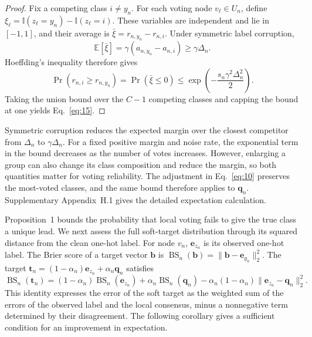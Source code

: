 \documentclass[times,review,10pt]{elsarticle}
\theoremstyle{definition}
\theoremstyle{plain}
\begin{document}
\begin{proof}
\renewcommand{\qedsymbol}{}
Fix a competing class \(i\ne y_n\). For each voting node \(v_\ell\in U_n\), define \(\xi_\ell=\mathbb I(z_\ell=y_n)-\mathbb I(z_\ell=i)\). These variables are independent and lie in \([-1,1]\), and their average is \(\bar\xi=r_{n,y_n}-r_{n,i}\). Under symmetric label corruption,
\[
\mathbb E[\bar\xi]=\gamma(a_{n,y_n}-a_{n,i})\geq\gamma\Delta_n.
\]
Hoeffding's inequality \cite{hoeffding1963} therefore gives
\[
\Pr\!\left(r_{n,i}\geq r_{n,y_n}\right)=\Pr(\bar\xi\leq0)
\leq\exp\!\left(-\frac{s_n\gamma^2\Delta_n^2}{2}\right).
\]
Taking the union bound over the \(C-1\) competing classes and capping the bound at one yields Eq.~\eqref{eq:15}.
\end{proof}

Symmetric corruption reduces the expected margin over the closest competitor from \(\Delta_n\) to \(\gamma\Delta_n\). For a fixed positive margin and noise rate, the exponential term in the bound decreases as the number of votes increases. However, enlarging a group can also change its class composition and reduce the margin, so both quantities matter for voting reliability. The adjustment in Eq.~\eqref{eq:10} preserves the most-voted classes, and the same bound therefore applies to \(\mathbf q_n\). Supplementary Appendix~H.1 gives the detailed expectation calculation.

Proposition~1 bounds the probability that local voting fails to give the true class a unique lead. We next assess the full soft-target distribution through its squared distance from the clean one-hot label. For node \(v_n\), \(\mathbf e_{z_n}\) is its observed one-hot label. The Brier score of a target vector \(\mathbf b\) is \(\operatorname{BS}_n(\mathbf b)=\|\mathbf b-\mathbf e_{y_n}\|_2^2\). The target \(\mathbf t_n=(1-\alpha_n)\mathbf e_{z_n}+\alpha_n\mathbf q_n\) satisfies
\begin{equation}\label{eq:16}
\operatorname{BS}_n(\mathbf t_n)=(1-\alpha_n)\operatorname{BS}_n(\mathbf e_{z_n})+\alpha_n\operatorname{BS}_n(\mathbf q_n)-\alpha_n(1-\alpha_n)\|\mathbf e_{z_n}-\mathbf q_n\|_2^2.
\end{equation}
This identity expresses the error of the soft target as the weighted sum of the errors of the observed label and the local consensus, minus a nonnegative term determined by their disagreement. The following corollary gives a sufficient condition for an improvement in expectation.
\end{document}
